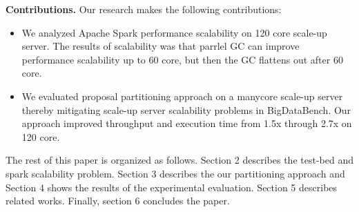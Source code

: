 \fi

\ifkor

\textbf{Contributions.} Our research makes the following contributions:
\begin{itemize}
\item 
We analyzed Apache Spark performance scalability on 120 core scale-up server.
The results of scalability was that parrlel GC can improve performance
scalability up to 60 core, but then the GC flattens out after 60 core.
\item 
We evaluated proposal partitioning approach on a manycore scale-up
server thereby mitigating scale-up server scalability problems in BigDataBench.
Our approach improved throughput and execution time from 1.5x through
2.7x on 120 core.
\end{itemize}

\else

\fi


The rest of this paper is organized as follows.
Section 2 describes the test-bed and spark scalability problem.
Section 3 describes the our partitioning approach and 
Section 4 shows the results of the experimental evaluation. 
Section 5 describes related works. 
Finally, section 6 concludes the paper.

